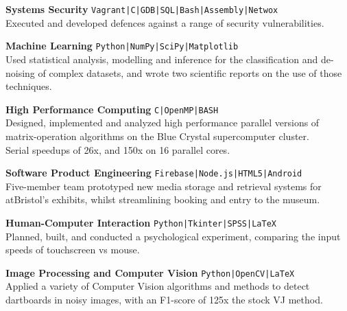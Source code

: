 \documentclass[10pt]{article}
\newcommand{\bold}[1]{\textbf{\textcolor{dark}{#1}}}
\newcommand{\zz}[3]{
{\large\bold{#1}} \hfill 
{\small \colorbox{light}{\texttt{#3}}}\\
{#2}\vspace{0.6em}}
\newcommand{\li}{\textcolor{mid}{|}}
\begin{document}
\begin{minipage}[t]{0.65\textwidth}



\zz{Systems Security}
{Executed and developed defences against a range of security vulnerabilities.}
{Vagrant\li C\li GDB\li SQL\li Bash\li Assembly\li Netwox}

\zz{Machine Learning}
{Used statistical analysis, modelling and inference for the classification and de-noising of complex datasets, and wrote two scientific reports on the use of those techniques.}
{Python\li NumPy\li SciPy\li Matplotlib}

\zz{High Performance Computing}
{Designed, implemented and analyzed high performance parallel versions of matrix-operation algorithms on the Blue Crystal supercomputer cluster.\\
Serial speedups of 26x, and 150x on 16 parallel cores.}
{C\li OpenMP\li BASH}

\zz{Software Product Engineering}
{Five-member team prototyped new media storage and retrieval systems for atBristol's exhibits, whilst streamlining booking and entry to the museum.}{Firebase\li Node.js\li HTML5\li Android}

\zz{Human-Computer Interaction}
{Planned, built, and conducted a psychological experiment, comparing the input speeds of touchscreen vs mouse.}{Python\li Tkinter\li SPSS\li LaTeX}

\zz{Image Processing and Computer Vision}
{Applied a variety of Computer Vision algorithms and methods to detect dartboards in noisy images, with an F1-score of 125x the stock VJ method.}
{Python\li OpenCV\li LaTeX}





\end{minipage}
\end{document}

